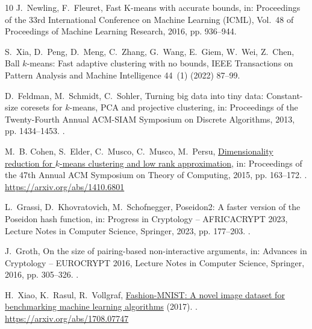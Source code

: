 \documentclass[5p,times,twocolumn]{elsarticle}
\begin{document}
\begin{thebibliography}{10}
J.~Newling, F.~Fleuret, Fast {K}-means with accurate bounds, in: Proceedings of the 33rd International Conference on Machine Learning (ICML), Vol.~48 of Proceedings of Machine Learning Research, 2016, pp. 936--944.

S.~Xia, D.~Peng, D.~Meng, C.~Zhang, G.~Wang, E.~Giem, W.~Wei, Z.~Chen, Ball $k$-means: Fast adaptive clustering with no bounds, IEEE Transactions on Pattern Analysis and Machine Intelligence 44~(1) (2022) 87--99.

D.~Feldman, M.~Schmidt, C.~Sohler, Turning big data into tiny data:
  Constant-size coresets for $k$-means, {PCA} and projective clustering, in:
  Proceedings of the Twenty-Fourth Annual ACM-SIAM Symposium on Discrete
  Algorithms, 2013, pp. 1434--1453.
\newblock \href {https://doi.org/10.1137/1.9781611973105.103}
  {}.

M.~B. Cohen, S.~Elder, C.~Musco, C.~Musco, M.~Persu,
  \href{https://arxiv.org/abs/1410.6801}{Dimensionality reduction for $k$-means
  clustering and low rank approximation}, in: Proceedings of the 47th Annual
  ACM Symposium on Theory of Computing, 2015, pp. 163--172.
\newblock \href {https://doi.org/10.1145/2746539.2746569}
  {}.
\newline\urlprefix\url{https://arxiv.org/abs/1410.6801}

L.~Grassi, D.~Khovratovich, M.~Schofnegger, {Poseidon2}: A faster version of the {Poseidon} hash function, in: Progress in Cryptology -- AFRICACRYPT 2023, Lecture Notes in Computer Science, Springer, 2023, pp. 177--203. \newblock \href {https://doi.org/10.1007/978-3-031-37679-5_8} {}.


J.~Groth, On the size of pairing-based non-interactive arguments, in: Advances in Cryptology -- EUROCRYPT 2016, Lecture Notes in Computer Science, Springer, 2016, pp. 305--326. \newblock \href {https://doi.org/10.1007/978-3-662-49896-5_11} {}.


H.~Xiao, K.~Rasul, R.~Vollgraf,
  \href{https://arxiv.org/abs/1708.07747}{{Fashion-MNIST}: A novel image
  dataset for benchmarking machine learning algorithms} (2017).
\newblock \href {http://arxiv.org/abs/1708.07747} {}.
\newline\urlprefix\url{https://arxiv.org/abs/1708.07747}


\end{thebibliography}
\end{document}
